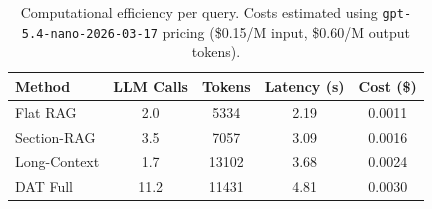 \begin{table}[t]
\centering
\caption{Computational efficiency per query. Costs estimated using \texttt{gpt-5.4-nano-2026-03-17} pricing (\$0.15/M input, \$0.60/M output tokens).}
\label{tab:efficiency}
\begin{tabular}{lcccc}
\toprule
\textbf{Method} & \textbf{LLM Calls} & \textbf{Tokens} & \textbf{Latency (s)} & \textbf{Cost (\$)} \\
\midrule
Flat RAG & 2.0 & 5334 & 2.19 & 0.0011 \\
Section-RAG & 3.5 & 7057 & 3.09 & 0.0016 \\
Long-Context & 1.7 & 13102 & 3.68 & 0.0024 \\
DAT Full & 11.2 & 11431 & 4.81 & 0.0030 \\
\bottomrule
\end{tabular}
\end{table}
